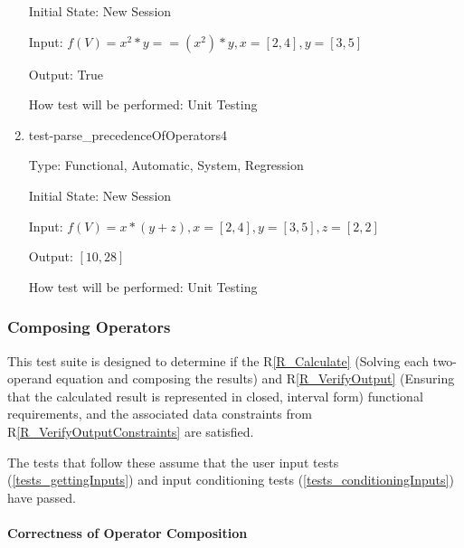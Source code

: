 \documentclass[12pt, titlepage]{article}
\newcommand{\rref}[1]{R\ref{#1}}
\begin{document}
\begin{enumerate}
	Initial State: New Session
	
	Input: $f(V) = x^2 * y == (x^2) * y, x = [2,4], y = [3,5]$
	
	Output: True
	
	How test will be performed: Unit Testing\\	
	
	\item{test-parse\_precedenceOfOperators4}
	
	Type: Functional, Automatic, System, Regression
	
	Initial State: New Session
	
	Input: $f(V) = x * (y + z), x = [2,4], y = [3,5], z = [2,2]$
	
	Output: $[10, 28]$
	
	How test will be performed: Unit Testing\\
	
\end{enumerate}

\subsubsection{Composing Operators}
\label{tests_operatorComposition}
This test suite is designed to determine if the \rref{R_Calculate} (Solving 
each two-operand equation and composing the results) and \rref{R_VerifyOutput} 
(Ensuring that the calculated result is represented in closed, interval form) 
functional requirements, and the associated data constraints from 
\rref{R_VerifyOutputConstraints} are satisfied.

The tests that follow these assume that the user input tests 
(\ref{tests_gettingInputs}) and input conditioning tests 
(\ref{tests_conditioningInputs}) have passed.

\paragraph{Correctness of Operator Composition}
\end{document}
